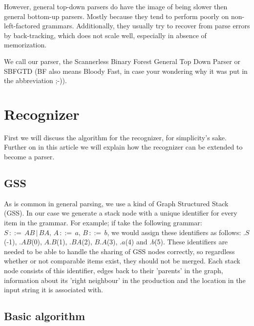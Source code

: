 \documentclass[a4paper,10pt]{article}
\begin{document}
However, general top-down parsers do have the image of being slower then general bottom-up parsers. Mostly because they tend to perform poorly on non-left-factored grammars. Additionally, they usually try to recover from parse errors by back-tracking, which does not scale well, especially in absence of memorization.

We call our parser, the Scannerless Binary Forest General Top Down Parser or SBFGTD (BF also means Bloody Fast, in case your wondering why it was put in the abbreviation ;-)).

\section{Recognizer}

First we will discuss the algorithm for the recognizer, for simplicity's sake. Further on in this article we will explain how the recognizer can be extended to become a parser.

\subsection{GSS}

As is common in general parsing, we use a kind of Graph Structured Stack (GSS). In our case we generate a stack node with a unique identifier for every item in the grammar. For example; if take the following grammar: $S\,::=\,AB\,|\,BA,\,A\,::=\,a,\,B\,::=\,b$, we would assign these identifiers as follows: $.S$(-1), $.AB$(0), $A.B$(1), $.BA$(2), $B.A$(3), $.a$(4) and $.b$(5). These identifiers are needed to be able to handle the sharing of GSS nodes correctly, so regardless whether or not comparable items exist, they should not be merged. Each stack node consists of this identifier, edges back to their 'parents' in the graph, information about its 'right neighbour' in the production and the location in the input string it is associated with.

\subsection{Basic algorithm}
\end{document}
